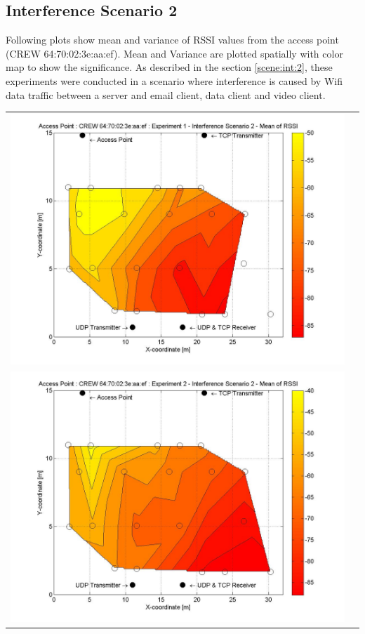 \documentclass[11pt,a4paper,headinclude,footinclude,chapterprefix=on]{scrreprt}
\begin{document}
\subsection{Interference Scenario 2} 
Following plots show mean and variance of RSSI values from the access point (CREW 64:70:02:3e:aa:ef). Mean and Variance are plotted spatially with color map to show the significance. As described in the section \ref{scene:int:2}, these experiments were conducted in a scenario where interference is caused by Wifi data traffic between a server and email client, data client and video client.
\begin{longtable}
	{lr} 
	\includegraphics[width=13cm]{../../Source/plot/CREW_ef/ef_Wifi_Ex_1_Mean.jpg} \\
	\includegraphics[width=13cm]{../../Source/plot/CREW_ef/ef_Wifi_Ex_2_Mean.jpg} \\

\end{longtable}
\end{document}
